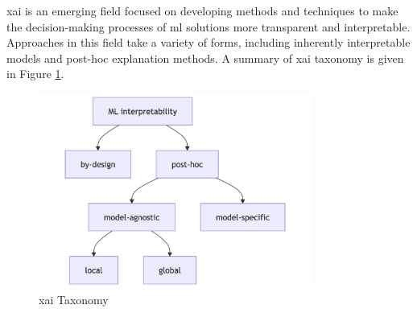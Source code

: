 \acrfull{xai} is an emerging field focused on developing methods and techniques to make the decision-making processes of \acrshort{ml} solutions more transparent and interpretable. Approaches in this field take a variety of forms, including inherently interpretable models and post-hoc explanation methods. A summary of \acrshort{xai} taxonomy is given in Figure \ref{fig:xai-taxonomy}.

\begin{figure}[ht]
    \centering
    \includegraphics[width=0.8\textwidth]{../figures/static/xai-taxonomy.jpg}
    \caption{\acrshort{xai} Taxonomy \citep{Molnar2025}}
    \label{fig:xai-taxonomy}
\end{figure}


